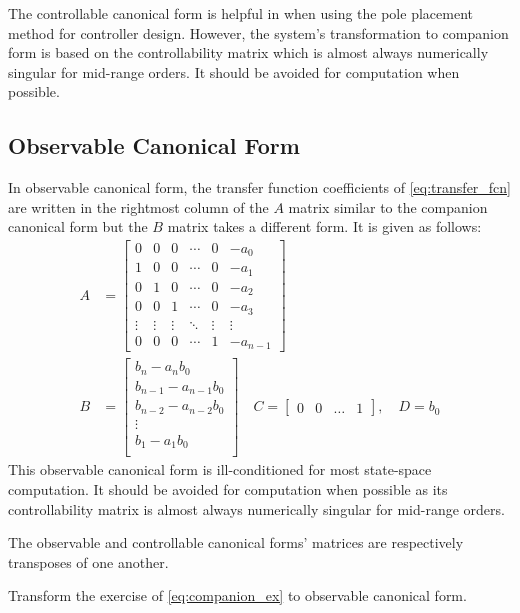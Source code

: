 The controllable canonical form is helpful in when using the pole placement method for controller design. However, the system's transformation to companion form is based on the controllability matrix which is almost always numerically singular for mid-range orders. It should be avoided for computation when possible.

\subsection{Observable Canonical Form}

In observable canonical form, the transfer function coefficients of \eqref{eq:transfer_fcn} are written in the rightmost column of the $A$ matrix similar to the companion canonical form but the $B$ matrix takes a different form. It is given as follows:
%
\begin{align}
A &= \begin{bmatrix} 0 & 0 & 0 & \cdots & 0 & -a_0 \\
1 & 0 & 0 & \cdots & 0 & -a_1 \\
0 & 1 & 0 & \cdots & 0 & -a_2 \\
0 & 0 & 1 & \cdots & 0 & -a_3 \\
\vdots & \vdots & \vdots &\ddots & \vdots & \vdots \\
0 & 0 & 0 & \cdots & 1 & -a_{n-1} 
\end{bmatrix} \\
%
B &= \begin{bmatrix}
	b_n - a_n b_0 \\
	b_{n-1} - a_{n-1} b_0 \\
	b_{n-2} - a_{n-2} b_0 \\
	\vdots \\
	b_{1} - a_{1} b_0 \\
\end{bmatrix}
%
\quad 
C = \begin{bmatrix}
 0  & 0 & \ldots & 1
\end{bmatrix}, \quad D = b_0
 \end{align}
%
This observable canonical form is ill-conditioned for most state-space computation. It should be avoided for computation when possible as its controllability matrix is almost always numerically singular for mid-range orders.

The observable and controllable canonical forms' matrices are respectively transposes of one another.

%
\begin{homework}
Transform the exercise of \ref{eq:companion_ex} to observable canonical form.
\end{homework}

